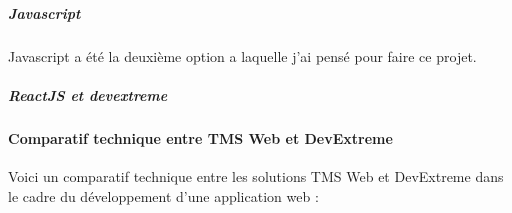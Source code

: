 \documentclass[a4paper, 12pt, french]{article}
\begin{document}
						\subparagraph{Javascript\\}
							Javascript a été la deuxième option a laquelle j'ai pensé pour faire ce projet.%
						\subparagraph{ReactJS et devextreme\\}%

					\paragraph{Comparatif technique entre TMS Web et DevExtreme\\}
							Voici un comparatif technique entre les solutions TMS Web et DevExtreme dans le cadre du développement d'une application web :\\
\end{document}
